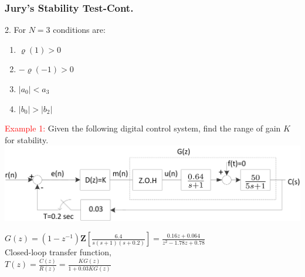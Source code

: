 \documentclass[mathserif, 10pt]{beamer} %
\def\Z{\mathbf{Z}}
\begin{document}
\frame
{
\vspace{-.15in}
\normalsize

\frametitle{Jury's Stability Test-Cont. }

2. For $N=3$ conditions are:\\
\begin{enumerate}
	\item $\varrho(1)>0$
	\item $-\varrho(-1)>0$
	\item $|a_0|<a_3$
	\item $|b_0|>|b_2|$
\end{enumerate}

\textcolor{red}{Example 1:} Given the following digital control system, find the range of gain $K$ for stability.\\
\includegraphics[width=.75\linewidth]{./Figures/example1_diag.png} \vspace{.05in}

$G(z) = (1-z^{-1})\Z\left[\frac{6.4}{s(s+1)(s+0.2)}\right] = \frac{0.16z+0.064}{z^2-1.78z+0.78}$ \\ \vspace{.05in}
Closed-loop transfer function, \\ \vspace{.05in}
$T(z) = \frac{C(z)}{R(z)}= \frac{KG(z)}{1+0.03KG(z)}$
}
\end{document}

